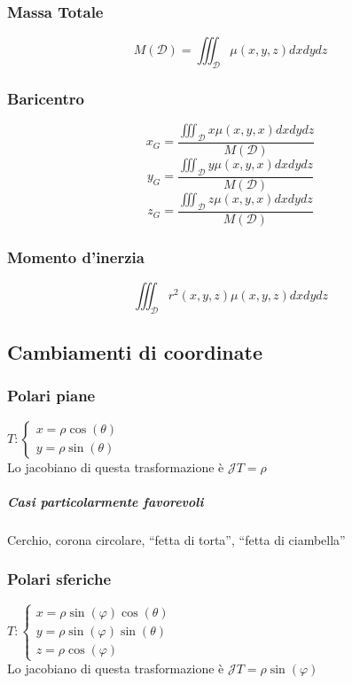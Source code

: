 \documentclass[10pt,a4paper]{report}
\begin{document}
			\subsubsection{Massa Totale}
			\[ M(\mathcal{D})= \iiint_{\mathcal{D}} \mu(x,y,z) dx dy dz \]
			
			\subsubsection{Baricentro}
			\[ x_{G}=\frac{\iiint_{\mathcal{D}} x \mu (x,y,x) dx dy dz}{ M(\mathcal{D})} \]
			\[ y_{G}=\frac{\iiint_{\mathcal{D}} y \mu (x,y,x) dx dy dz}{ M(\mathcal{D})} \]
			\[ z_{G}=\frac{\iiint_{\mathcal{D}} z \mu (x,y,x) dx dy dz}{ M(\mathcal{D})} \]
			
			\subsubsection{Momento d'inerzia}
			\[ \iiint_{\mathcal{D}} r^{2}(x,y,z) \mu(x,y,z) dx dy dz \]

		\subsection*{Cambiamenti di coordinate}
			\subsubsection{Polari piane}
			$ T: \begin{cases} 
				x=\rho \cos(\theta) \\ 
				y=\rho \sin(\theta)
			\end{cases} $
            \\
           	Lo jacobiano di questa trasformazione è $\mathcal{J}T=\rho $
				\subparagraph{Casi particolarmente favorevoli}
				Cerchio, corona circolare, ``fetta di torta'', ``fetta di ciambella''
			\subsubsection{Polari sferiche}
			$ T: \begin{cases} 
				x=\rho \sin(\varphi)\cos(\theta) \\ 
				y=\rho \sin(\varphi)\sin(\theta) \\
				z=\rho \cos(\varphi)
			\end{cases} $
			\\
			Lo jacobiano di questa trasformazione è $\mathcal{J}T=\rho \sin(\varphi) $
			
\end{document}
